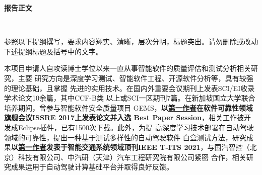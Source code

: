 \documentclass[a4paper,zihao=-4]{article}
\begin{document}

\setlength{\abovedisplayskip}{0pt}
\setlength{\belowdisplayskip}{0pt}

\begin{center}
	{\kaishu {} \textbf{报告正文} \vspace{-3ex}}
\end{center}  

\thispagestyle{empty} 　　　%

{\kaishu {}参照以下提纲撰写，要求内容翔实、清晰，层次分明，标题突出。}\alert{请勿删除或改动下述提纲标题及括号中的文字。\vspace{9bp}}





















本项目申请人自攻读博士学位以来一直从事智能软件的质量评估和测试分析相关研究，主要
研究方向是深度学习测试、智能软件工程、开源软件分析等，具有较强的理论基础，且掌握
先进的实用技术。{在国内外重要会议期刊上发表SCI/EI收录学术论文10余篇，其中CCF-B类
以上或SCI一区期刊7篇}。在新加坡国立大学联合培养期间，曾参与智能软件安全质量项目
GEMS，\textbf{以{\underline{第一作者}在软件可靠性领域旗舰会议ISSRE 2017上发表论文并入选
{Best Paper Session}}}，相关工作被开发成Eclipse插件，已有1500次下载。此外，为提
高深度学习技术部署在自动驾驶领域的可靠性，提出{一种基于测试多样性的自动驾驶软件
白盒测试方法}，研究成果\textbf{以\underline{第一作者}发表于智能交通系统领域顶刊IEEE T-ITS
2021}，与国汽智控（北京）科技有限公司、中汽研（天津）汽车工程研究院有限公司紧密
合作，相关研究成果运用于自动驾驶计算基础平台并取得良好反馈。
\end{document}

